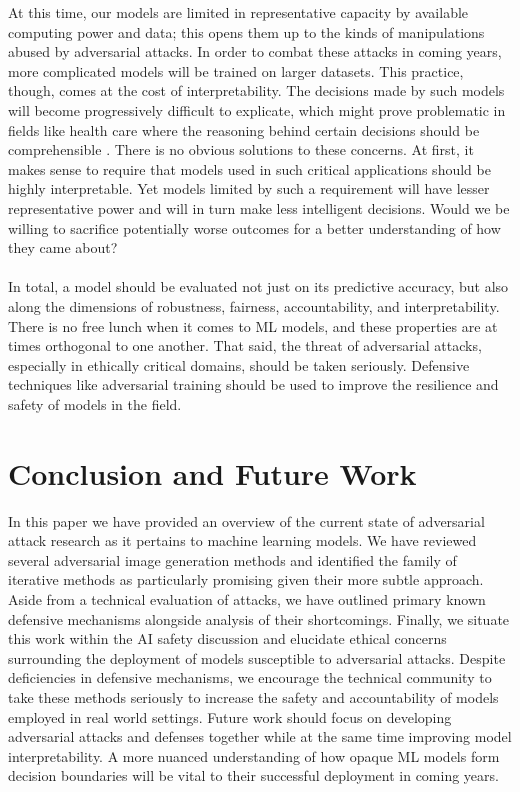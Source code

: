\documentclass[]{article}
\begin{document}
At this time, our models are limited in representative capacity by available computing power and data; this opens them up to the kinds of manipulations abused by adversarial attacks. In order to combat these attacks in coming years, more complicated models will be trained on larger datasets. This practice, though, comes at the cost of interpretability. The decisions made by such models will become progressively difficult to explicate, which might prove problematic in fields like health care where the reasoning behind certain decisions should be comprehensible \citep{international2009estimation}. There is no obvious solutions to these concerns. At first, it makes sense to require that models used in such critical applications should be highly interpretable. Yet models limited by such a requirement will have lesser representative power and will in turn make less intelligent decisions. Would we be willing to sacrifice potentially worse outcomes for a better understanding of how they came about?
\\\\
In total, a model should be evaluated not just on its predictive accuracy, but also along the dimensions of robustness, fairness, accountability, and interpretability. There is no free lunch when it comes to ML models, and these properties are at times orthogonal to one another. That said, the threat of adversarial attacks, especially in ethically critical domains, should be taken seriously. Defensive techniques like adversarial training should be used to improve the resilience and safety of models in the field. 

\section{Conclusion and Future Work}

In this paper we have provided an overview of the current state of adversarial attack research as it pertains to machine learning models. We have reviewed several adversarial image generation methods and identified the family of iterative methods as particularly promising given their more subtle approach. Aside from a technical evaluation of attacks, we have outlined primary known defensive mechanisms alongside analysis of their shortcomings. Finally, we situate this work within the AI safety discussion and elucidate ethical concerns surrounding the deployment of models susceptible to adversarial attacks. Despite deficiencies in defensive mechanisms, we encourage the technical community to take these methods seriously to increase the safety and accountability of models employed in real world settings. Future work should focus on developing adversarial attacks and defenses together while at the same time improving model interpretability. A more nuanced understanding of how opaque ML models form decision boundaries will be vital to their successful deployment in coming years.
\end{document}
